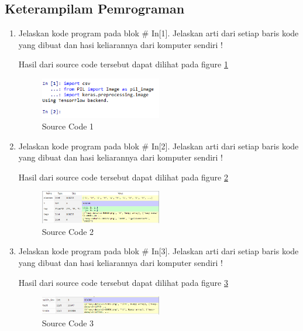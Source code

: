\subsection{Keterampilam Pemrograman}
\begin{enumerate}

\item Jelaskan kode program pada blok \# In[1]. Jelaskan arti dari setiap baris kode yang dibuat dan hasi keliarannya dari komputer sendiri !
	
	\subitem Hasil dari source code tersebut dapat dilihat pada figure \ref{YNC7-9}
	\begin{figure}[!htbp!]
		\centerline{\includegraphics[width=0.5\textwidth]{figures/YN/Chapter7/YNC7-9.png}}
		\caption{Source Code 1}
		\label{YNC7-9}
	\end{figure}	

\item Jelaskan kode program pada blok \# In[2]. Jelaskan arti dari setiap baris kode yang dibuat dan hasi keliarannya dari komputer sendiri !
	
	\subitem Hasil dari source code tersebut dapat dilihat pada figure \ref{YNC7-10}
	\begin{figure}[!htbp!]
		\centerline{\includegraphics[width=0.5\textwidth]{figures/YN/Chapter7/YNC7-10.png}}
		\caption{Source Code 2}
		\label{YNC7-10}
	\end{figure}	

\item Jelaskan kode program pada blok \# In[3]. Jelaskan arti dari setiap baris kode yang dibuat dan hasi keliarannya dari komputer sendiri !
	
	\subitem Hasil dari source code tersebut dapat dilihat pada figure \ref{YNC7-11}
	\begin{figure}[!htbp!]
		\centerline{\includegraphics[width=0.5\textwidth]{figures/YN/Chapter7/YNC7-11.png}}
		\caption{Source Code 3}
		\label{YNC7-11}
	\end{figure}	


\end{enumerate}
